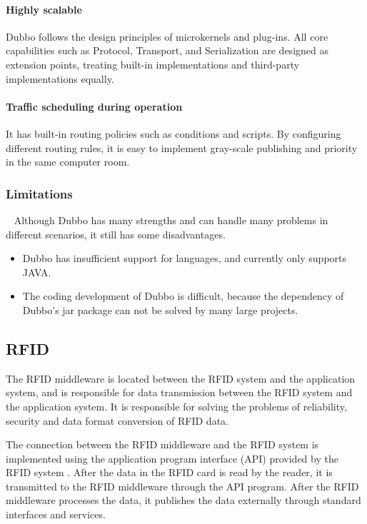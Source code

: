 \documentclass[conference]{IEEEtran}
\begin{document}
\paragraph{Highly scalable}
Dubbo follows the design principles of microkernels and plug-ins. All core capabilities such as Protocol, Transport, and Serialization are designed as extension points, treating built-in implementations and third-party implementations equally.

\paragraph{Traffic scheduling during operation}
It has built-in routing policies such as conditions and scripts. By configuring different routing rules, it is easy to implement gray-scale publishing and priority in the same computer room.


\subsubsection{Limitations}
\
\newline
\indent
Although Dubbo has many strengths and can handle many problems in different scenarios, it still has some disadvantages.

\begin{itemize}
\item Dubbo has insufficient support for languages, and currently only supports JAVA.

\item The coding development of Dubbo is difficult, because the dependency of Dubbo's jar package can not be solved by many large projects.
\end{itemize}


\subsection{RFID}

The RFID middleware is located between the RFID system and the application system, and is responsible for data transmission between the RFID system and the application system.
It is responsible for solving the problems of reliability, security and data format conversion of RFID data.

The connection between the RFID middleware and the RFID system is implemented using the application program interface (API) provided by the RFID system \cite{b8}. After the data in the RFID card is read by the reader, it is transmitted to the RFID middleware through the API program. After the RFID middleware processes the data, it publishes the data externally through standard interfaces and services.
\end{document}
